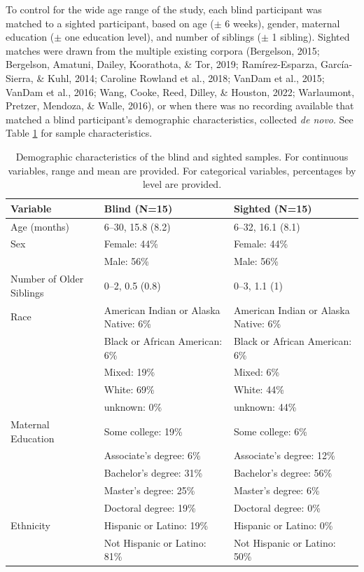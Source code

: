 \documentclass[
  man]{apa6}
\begin{document}
To control for the wide age range of the study, each blind participant was matched to a sighted participant, based on age (\(\pm\) 6 weeks), gender, maternal education (\(\pm\) one education level), and number of siblings (\(\pm\) 1 sibling). Sighted matches were drawn from the multiple existing corpora (Bergelson, 2015; Bergelson, Amatuni, Dailey, Koorathota, \& Tor, 2019; Ramírez-Esparza, García-Sierra, \& Kuhl, 2014; Caroline Rowland et al., 2018; VanDam et al., 2015; VanDam et al., 2016; Wang, Cooke, Reed, Dilley, \& Houston, 2022; Warlaumont, Pretzer, Mendoza, \& Walle, 2016), or when there was no recording available that matched a blind participant's demographic characteristics, collected \emph{de novo}. See Table \ref{tab:participant-characteristics} for sample characteristics.

\begin{table}

\caption{\label{tab:participant-characteristics}Demographic characteristics of the blind and sighted samples. For continuous variables, range and mean are provided. For categorical variables, percentages by level are provided.}
\centering
\fontsize{8}{10}\selectfont
\begin{tabular}[t]{l|l|l}
\hline
Variable & Blind (N=15) & Sighted (N=15)\\
\hline
Age (months) & 6--30,
15.8 (8.2) & 6--32,
16.1 (8.1)\\
\hline
Sex & Female: 44\% & Female: 44\%\\
\hline
 & Male: 56\% & Male: 56\%\\
\hline
Number of Older Siblings & 0--2,
0.5 (0.8) & 0--3,
1.1 (1)\\
\hline
Race & American Indian or Alaska Native: 6\% & American Indian or Alaska Native: 6\%\\
\hline
 & Black or African American: 6\% & Black or African American: 6\%\\
\hline
 & Mixed: 19\% & Mixed: 6\%\\
\hline
 & White: 69\% & White: 44\%\\
\hline
 & unknown: 0\% & unknown: 44\%\\
\hline
Maternal Education & Some college: 19\% & Some college: 6\%\\
\hline
 & Associate's degree: 6\% & Associate's degree: 12\%\\
\hline
 & Bachelor's degree: 31\% & Bachelor's degree: 56\%\\
\hline
 & Master's degree: 25\% & Master's degree: 6\%\\
\hline
 & Doctoral degree: 19\% & Doctoral degree: 0\%\\
\hline
Ethnicity & Hispanic or Latino: 19\% & Hispanic or Latino: 0\%\\
\hline
 & Not Hispanic or Latino: 81\% & Not Hispanic or Latino: 50\%\\
\hline
\end{tabular}
\end{table}
\end{document}
